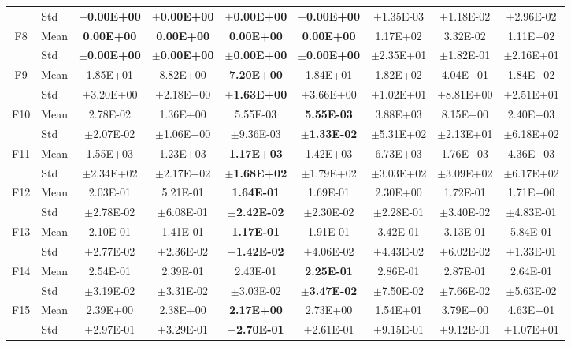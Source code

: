 \begin{table}[htbp]
{\begin{tabular}{clccccccc}
 & Std & $\pm$\textbf{0.00E+00} & $\pm$\textbf{0.00E+00} & $\pm$\textbf{0.00E+00} & $\pm$\textbf{0.00E+00} & $\pm$1.35E-03 & $\pm$1.18E-02 & $\pm$2.96E-02 \\
F8 & Mean & \textbf{0.00E+00} & \textbf{0.00E+00} & \textbf{0.00E+00} & \textbf{0.00E+00} & 1.17E+02 & 3.32E-02 & 1.11E+02 \\
 & Std & $\pm$\textbf{0.00E+00} & $\pm$\textbf{0.00E+00} & $\pm$\textbf{0.00E+00} & $\pm$\textbf{0.00E+00} & $\pm$2.35E+01 & $\pm$1.82E-01 & $\pm$2.16E+01 \\
F9 & Mean & 1.85E+01 & 8.82E+00 & \textbf{7.20E+00} & 1.84E+01 & 1.82E+02 & 4.04E+01 & 1.84E+02 \\
 & Std & $\pm$3.20E+00 & $\pm$2.18E+00 & $\pm$\textbf{1.63E+00} & $\pm$3.66E+00 & $\pm$1.02E+01 & $\pm$8.81E+00 & $\pm$2.51E+01 \\
F10 & Mean & 2.78E-02 & 1.36E+00 & 5.55E-03 & \textbf{5.55E-03} & 3.88E+03 & 8.15E+00 & 2.40E+03 \\
 & Std & $\pm$2.07E-02 & $\pm$1.06E+00 & $\pm$9.36E-03 & $\pm$\textbf{1.33E-02} & $\pm$5.31E+02 & $\pm$2.13E+01 & $\pm$6.18E+02 \\
F11 & Mean & 1.55E+03 & 1.23E+03 & \textbf{1.17E+03} & 1.42E+03 & 6.73E+03 & 1.76E+03 & 4.36E+03 \\
 & Std & $\pm$2.34E+02 & $\pm$2.17E+02 & $\pm$\textbf{1.68E+02} & $\pm$1.79E+02 & $\pm$3.03E+02 & $\pm$3.09E+02 & $\pm$6.17E+02 \\
F12 & Mean & 2.03E-01 & 5.21E-01 & \textbf{1.64E-01} & 1.69E-01 & 2.30E+00 & 1.72E-01 & 1.71E+00 \\
 & Std & $\pm$2.78E-02 & $\pm$6.08E-01 & $\pm$\textbf{2.42E-02} & $\pm$2.30E-02 & $\pm$2.28E-01 & $\pm$3.40E-02 & $\pm$4.83E-01 \\
F13 & Mean & 2.10E-01 & 1.41E-01 & \textbf{1.17E-01} & 1.91E-01 & 3.42E-01 & 3.13E-01 & 5.84E-01 \\
 & Std & $\pm$2.77E-02 & $\pm$2.36E-02 & $\pm$\textbf{1.42E-02} & $\pm$4.06E-02 & $\pm$4.43E-02 & $\pm$6.02E-02 & $\pm$1.33E-01 \\
F14 & Mean & 2.54E-01 & 2.39E-01 & 2.43E-01 & \textbf{2.25E-01} & 2.86E-01 & 2.87E-01 & 2.64E-01 \\
 & Std & $\pm$3.19E-02 & $\pm$3.31E-02 & $\pm$3.03E-02 & $\pm$\textbf{3.47E-02} & $\pm$7.50E-02 & $\pm$7.66E-02 & $\pm$5.63E-02 \\
F15 & Mean & 2.39E+00 & 2.38E+00 & \textbf{2.17E+00} & 2.73E+00 & 1.54E+01 & 3.79E+00 & 4.63E+01 \\
 & Std & $\pm$2.97E-01 & $\pm$3.29E-01 & $\pm$\textbf{2.70E-01} & $\pm$2.61E-01 & $\pm$9.15E-01 & $\pm$9.12E-01 & $\pm$1.07E+01 \\

\end{tabular}}
\end{table}
